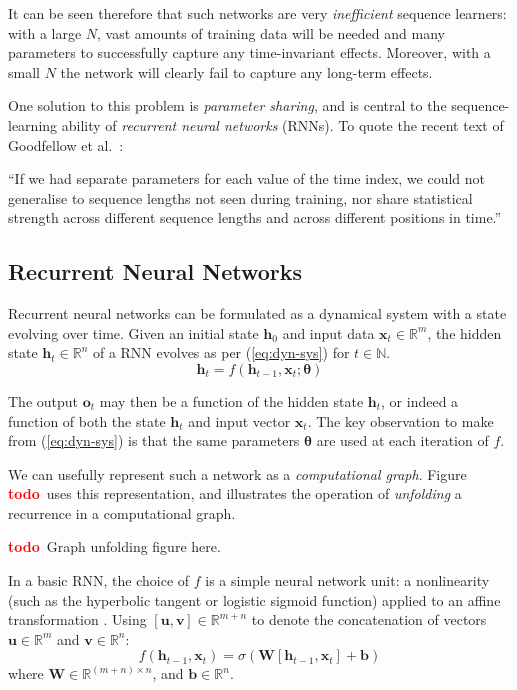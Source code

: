 \documentclass[12pt,a4paper,twoside,openright]{report}
\newcommand{\vect}[1]{\boldsymbol{\mathbf{#1}}}
\newcommand{\todo}{\textcolor{red}{\textbf{todo}~}}
\begin{document}
It can be seen therefore that such networks are very \emph{inefficient} sequence
learners: with a large $N$, vast amounts of training data will be needed and
many parameters to successfully capture any time-invariant effects. Moreover,
with a small $N$ the network will clearly fail to capture any long-term effects.

One solution to this problem is \emph{parameter sharing}, and is central to the
sequence-learning ability of \emph{recurrent neural networks} (RNNs). To quote
the recent text of Goodfellow et al.\ \cite{Goodfellow-et-al-2016}:
\begin{displayquote}
  ``If we had separate parameters for each value of the time index, we could not
  generalise to sequence lengths not seen during training, nor share statistical
  strength across different sequence lengths and across diﬀerent positions in
  time.''
\end{displayquote}

\subsection{Recurrent Neural Networks}\label{sec:rnn-intro}

Recurrent neural networks can be formulated as a dynamical system with a state
evolving over time. Given an initial state $\vect{h}_0$ and input data
$\vect{x}_t \in \mathbb{R}^m$, the hidden state $\vect{h}_t \in \mathbb{R}^n$ of
a RNN evolves as per (\ref{eq:dyn-sys}) for $t \in \mathbb{N}$.
\begin{equation}
  \bm{h}_t = f(\vect{h}_{t-1}, \vect{x}_t; \vect{\theta})
  \label{eq:dyn-sys}
\end{equation} 

The output
$\vect{o}_t$ may then be a function of the hidden state $\vect{h}_t$, or indeed
a function of both the state $\vect{h}_t$ and input vector $\vect{x}_t$. The key
observation to make from (\ref{eq:dyn-sys}) is that the same parameters
$\vect{\theta}$ are used at each iteration of $f$. 

We can usefully represent such a network as a \emph{computational graph}. Figure
\todo uses this representation, and illustrates the operation of
\emph{unfolding} a recurrence in a computational graph.

\todo Graph unfolding figure here.

In a basic RNN, the choice of $f$ is a simple neural network unit: a
nonlinearity (such as the hyperbolic tangent or logistic sigmoid function)
applied to an affine transformation \cite{zaremba2014recurrent}. Using
$[\vect{u},\vect{v}] \in \mathbb{R}^{m+n}$ to denote the concatenation of
vectors $\vect{u} \in \mathbb{R}^m$ and $\vect{v} \in \mathbb{R}^n$: 
$$f(\vect{h}_{t-1}, \vect{x}_t) = \sigma(\vect{W}[\vect{h}_{t-1}, 
\vect{x}_t] + \vect{b})$$ 
where $\vect{W} \in \mathbb{R}^{(m+n) \times n}$, and $\vect{b} \in
\mathbb{R}^n$. 
\end{document}
